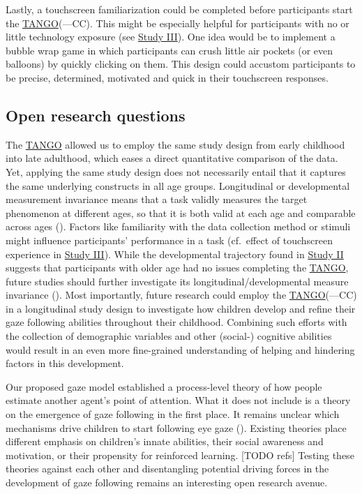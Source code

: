 \documentclass[
]{scrbook}
\begin{document}
Lastly, a touchscreen familiarization could be completed before participants start the \hyperref[acronyms_TANGO]{TANGO}(---CC). This might be especially helpful for participants with no or little technology exposure (see \hyperref[studyIII]{Study III}). One idea would be to implement a bubble wrap game in which participants can crush little air pockets (or even balloons) by quickly clicking on them. This design could accustom participants to be precise, determined, motivated and quick in their touchscreen responses.

\subsection{Open research questions}\label{open-research-questions}

The \hyperref[acronyms_TANGO]{TANGO} allowed us to employ the same study design from early childhood into late adulthood, which eases a direct quantitative comparison of the data. Yet, applying the same study design does not necessarily entail that it captures the same underlying constructs in all age groups. Longitudinal or developmental measurement invariance means that a task validly measures the target phenomenon at different ages, so that it is both valid at each age and comparable across ages (). Factors like familiarity with the data collection method or stimuli might influence participants' performance in a task (cf.~effect of touchscreen experience in \hyperref[studyIII]{Study III}). While the developmental trajectory found in \hyperref[studyII]{Study II} suggests that participants with older age had no issues completing the \hyperref[acronyms_TANGO]{TANGO}, future studies should further investigate its longitudinal/developmental measure invariance (). Most importantly, future research could employ the \hyperref[acronyms_TANGO]{TANGO}(---CC) in a longitudinal study design to investigate how children develop and refine their gaze following abilities throughout their childhood. Combining such efforts with the collection of demographic variables and other (social-) cognitive abilities would result in an even more fine-grained understanding of helping and hindering factors in this development.

Our proposed gaze model established a process-level theory of how people estimate another agent's point of attention. What it does not include is a theory on the emergence of gaze following in the first place. It remains unclear which mechanisms drive children to start following eye gaze (). Existing theories place different emphasis on children's innate abilities, their social awareness and motivation, or their propensity for reinforced learning. {[}TODO refs{]} Testing these theories against each other and disentangling potential driving forces in the development of gaze following remains an interesting open research avenue.
\end{document}
